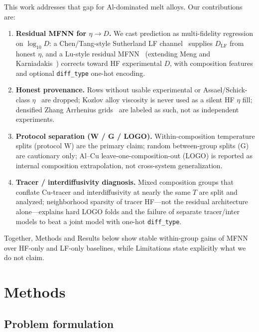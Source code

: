 \documentclass[review,12pt]{elsarticle}
\begin{document}
This work addresses that gap for Al-dominated melt alloys. Our contributions are:
\begin{enumerate}
\item \textbf{Residual MFNN for $\eta\to D$.} We cast prediction as multi-fidelity regression on $\log_{10} D$: a Chen/Tang-style Sutherland LF channel~\cite{tang2015,chen2014} supplies $D_{\mathrm{LF}}$ from honest $\eta$, and a Lu-style residual MFNN~\cite{lu2020pnas} (extending Meng and Karniadakis~\cite{meng2020jcp}) corrects toward HF experimental $D$, with composition features and optional \texttt{diff\_type} one-hot encoding.

\item \textbf{Honest provenance.} Rows without usable experimental or Assael/Schick-class $\eta$~\cite{assael2006,schick2012} are dropped; Kozlov alloy viscosity is never used as a silent HF $\eta$ fill; densified Zhang Arrhenius grids~\cite{zhang2010prl} are labeled as such, not as independent experiments.

\item \textbf{Protocol separation (W / G / LOGO).} Within-composition temperature splits (protocol W) are the primary claim; random between-group splits (G) are cautionary only; Al--Cu leave-one-composition-out (LOGO) is reported as internal composition extrapolation, not cross-system generalization.

\item \textbf{Tracer / interdiffusivity diagnosis.} Mixed composition groups that conflate Cu-tracer and interdiffusivity at nearly the same $T$ are split and analyzed; neighborhood sparsity of tracer HF---not the residual architecture alone---explains hard LOGO folds and the failure of separate tracer/inter models to beat a joint model with one-hot \texttt{diff\_type}.
\end{enumerate}

Together, Methods and Results below show stable within-group gains of MFNN over HF-only and LF-only baselines, while Limitations state explicitly what we do not claim.

\section{Methods}
\label{sec:methods}

\subsection{Problem formulation}
\label{sec:problem}
\end{document}
